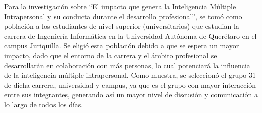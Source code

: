 Para la investigación sobre ``El impacto que genera la Inteligencia Múltiple Intrapersonal y su conducta durante el desarrollo profesional'', se tomó como población a los estudiantes de nivel superior (universitarios) que estudian la carrera de Ingeniería Informática en la Universidad Autónoma de Querétaro en el campus Juriquilla. Se eligió esta población debido a que se espera un mayor impacto, dado que el entorno de la carrera y el ámbito profesional se desarrollarán en colaboración con más personas, lo cual potenciará la influencia de la inteligencia múltiple intrapersonal. Como muestra, se seleccionó el grupo 31 de dicha carrera, universidad y campus, ya que es el grupo con mayor interacción entre sus integrantes, generando así un mayor nivel de discusión y comunicación a lo largo de todos los días.
